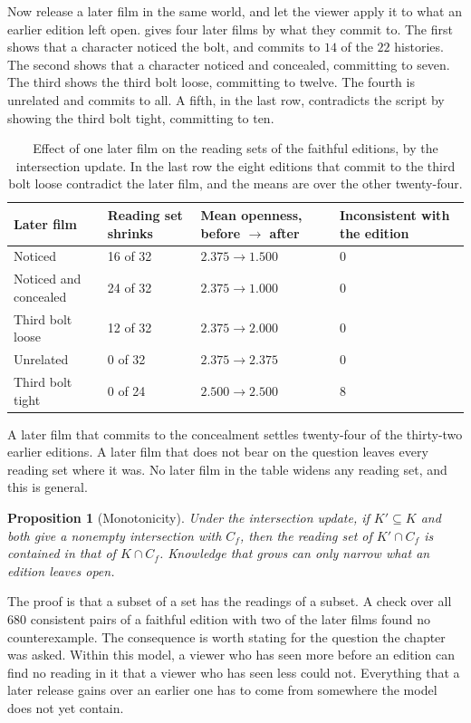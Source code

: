 \documentclass[11pt,twoside,openright]{book}
\theoremstyle{plain}
\newtheorem{proposition}[theorem]{Proposition}
\theoremstyle{definition}
\theoremstyle{remark}
\begin{document}
Now release a later film in the same world, and let the viewer apply it to what an earlier edition left open.  gives four later films by what they commit to. The first shows that a character noticed the bolt, and commits to $14$ of the $22$ histories. The second shows that a character noticed and concealed, committing to seven. The third shows the third bolt loose, committing to twelve. The fourth is unrelated and commits to all. A fifth, in the last row, contradicts the script by showing the third bolt tight, committing to ten.

\begin{table}[ht]
\centering
\begin{tabular}{@{}lp{2.6cm}p{3cm}p{2.4cm}@{}}
\toprule
Later film & Reading set shrinks & Mean openness, before $\to$ after & Inconsistent with the edition\\
\midrule
Noticed & 16 of 32 & $2.375\to1.500$ & 0\\
Noticed and concealed & 24 of 32 & $2.375\to1.000$ & 0\\
Third bolt loose & 12 of 32 & $2.375\to2.000$ & 0\\
Unrelated & 0 of 32 & $2.375\to2.375$ & 0\\
Third bolt tight & 0 of 24 & $2.500\to2.500$ & 8\\
\bottomrule
\end{tabular}
\caption{Effect of one later film on the reading sets of the faithful editions, by the intersection update. In the last row the eight editions that commit to the third bolt loose contradict the later film, and the means are over the other twenty-four.}\label{tab:retro14}
\end{table}

A later film that commits to the concealment settles twenty-four of the thirty-two earlier editions. A later film that does not bear on the question leaves every reading set where it was. No later film in the table widens any reading set, and this is general.

\begin{proposition}[Monotonicity]\label{prop:mono14}
Under the intersection update, if $K'\subseteq K$ and both give a nonempty intersection with $C_f$, then the reading set of $K'\cap C_f$ is contained in that of $K\cap C_f$. Knowledge that grows can only narrow what an edition leaves open.
\end{proposition}

The proof is that a subset of a set has the readings of a subset. A check over all $680$ consistent pairs of a faithful edition with two of the later films found no counterexample. The consequence is worth stating for the question the chapter was asked. Within this model, a viewer who has seen more before an edition can find no reading in it that a viewer who has seen less could not. Everything that a later release gains over an earlier one has to come from somewhere the model does not yet contain.
\end{document}
